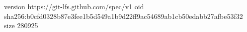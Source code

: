 version https://git-lfs.github.com/spec/v1
oid sha256:b0cfd0328b87e3fee1b5d549a1b9d22ff9ac54689ab1cb50edabb27afbe53f32
size 280925
